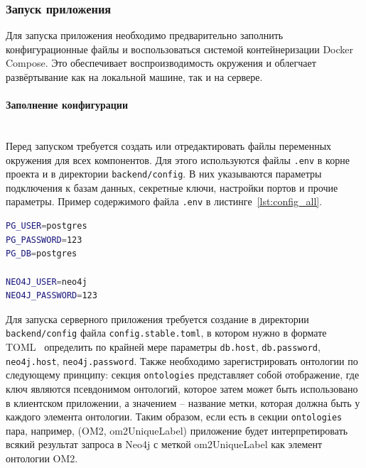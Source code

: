 \subsubsection{Запуск приложения}

Для запуска приложения необходимо предварительно заполнить конфигурационные файлы и воспользоваться системой контейнеризации Docker Compose.
Это обеспечивает воспроизводимость окружения и облегчает развёртывание как на локальной машине, так и на сервере.

\paragraph{Заполнение конфигурации} \mbox{}\\

Перед запуском требуется создать или отредактировать файлы переменных окружения для всех компонентов.
Для этого используются файлы \texttt{.env} в корне проекта и в директории \texttt{backend/config}.
В них указываются параметры подключения к базам данных, секретные ключи, настройки портов и прочие параметры.
Пример содержимого файла \texttt{.env} в листинге~\ref{lst:config_all}.
\begin{lstlisting}[frame=single, basicstyle=\footnotesize\ttfamily, label={lst:config_all}, caption={Заполнение конфигурационного файла всего приложения},captionpos=b, breaklines=true, breakatwhitespace=true, language=bash]
PG_USER=postgres
PG_PASSWORD=123
PG_DB=postgres

NEO4J_USER=neo4j
NEO4J_PASSWORD=123
\end{lstlisting}

Для запуска серверного приложения требуется создание в директории \texttt{backend/config} файла \texttt{config.stable.toml}, в котором нужно в формате TOML~\cite{Format:TOML} определить по крайней мере параметры \texttt{db.host}, \texttt{db.password}, \texttt{neo4j.host}, \texttt{neo4j.password}.
Также необходимо зарегистрировать онтологии по следующему принципу: секция \texttt{ontologies} представляет собой отображение, где ключ являются псевдонимом онтологий, которое затем может быть использовано в клиентском приложении, а значением – название метки, которая должна быть у каждого элемента онтологии.
Таким образом, если есть в секции \texttt{ontologies} пара, например, (OM2, om2UniqueLabel) приложение будет интерпретировать всякий результат запроса в Neo4j с меткой om2UniqueLabel как элемент онтологии OM2.

